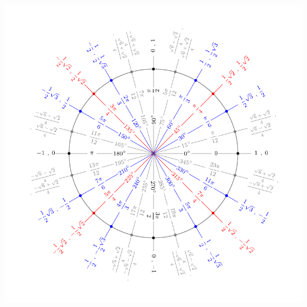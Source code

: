 \begin{minipage}{1.085\textwidth}
  \centering
  \includegraphics[width=\linewidth]{content/figures/einheitskreis_15}
\end{minipage}
